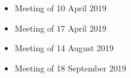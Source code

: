 \documentclass[../main/main.tex]{subfiles}
\begin{document}
\begin{itemize}
\item Meeting of 10 April 2019
\item Meeting of 17 April 2019
\item Meeting of 14 August 2019
\item Meeting of 18 September 2019
\end{itemize}
\end{document}
